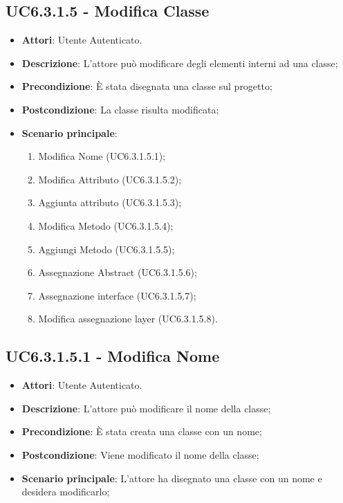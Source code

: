 \subsection{UC6.3.1.5 - Modifica Classe} 
\label{ssec:UC6.3.1.5} 
\begin{itemize} 
\item \textbf{Attori}: Utente Autenticato.
\item \textbf{Descrizione}: L'attore può modificare degli elementi interni ad una classe;
\item \textbf{Precondizione}: È stata disegnata una classe sul progetto;
\item \textbf{Postcondizione}: La classe risulta modificata;
\item \textbf{Scenario principale}: \begin{enumerate}\item Modifica Nome (UC6.3.1.5.1);\item Modifica Attributo (UC6.3.1.5.2);\item Aggiunta attributo (UC6.3.1.5.3);\item Modifica Metodo (UC6.3.1.5.4);\item Aggiungi Metodo (UC6.3.1.5.5);\item Assegnazione Abstract (UC6.3.1.5.6);\item Assegnazione interface (UC6.3.1.5.7);\item Modifica assegnazione layer (UC6.3.1.5.8). 
 \end{enumerate}
\end{itemize} 
\subsection{UC6.3.1.5.1 - Modifica Nome} 
\label{ssec:UC6.3.1.5.1} 
\begin{itemize} 
\item \textbf{Attori}: Utente Autenticato.
\item \textbf{Descrizione}: L'attore può modificare il nome della classe;
\item \textbf{Precondizione}: È stata creata una classe con un nome;
\item \textbf{Postcondizione}: Viene modificato il nome della classe;
\item \textbf{Scenario principale}: L'attore ha disegnato una classe con un nome e desidera modificarlo;\end{itemize} 
